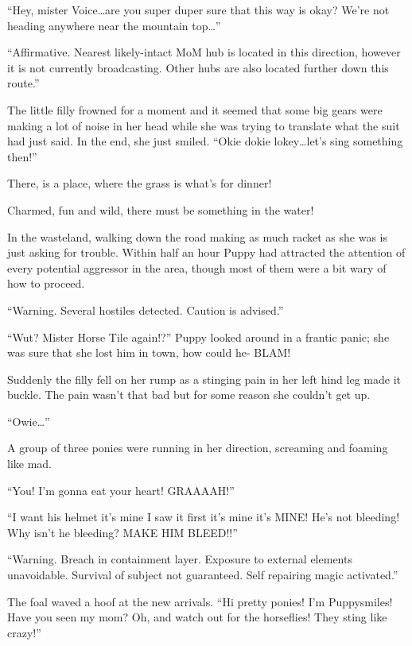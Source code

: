 ``Hey, mister Voice\dots are you super duper sure that this way is okay? We're not heading anywhere near the mountain top\dots''

``{\mt Affirmative. Nearest likely-intact MoM hub is located in this direction, however it is not currently broadcasting. Other hubs are also located further down this route.}''

The little filly frowned for a moment and it seemed that some big gears were making a lot of noise in her head while she was trying to translate what the suit had just said. In the end, she just smiled. ``Okie dokie lokey\dots let's sing something then!''

\begin{song}
    There, is a place, where the grass is what's for dinner!
    
    Charmed, fun and wild, there must be something in the water!
\end{song}

In the wasteland, walking down the road making as much racket as she was is just asking for trouble. Within half an hour Puppy had attracted the attention of every potential aggressor in the area, though most of them were a bit wary of how to proceed.

``{\mt Warning. Several hostiles detected. Caution is advised.}''

``Wut? Mister Horse Tile again!?'' Puppy looked around in a frantic panic; she was sure that she lost him in town, how could he- BLAM!

Suddenly the filly fell on her rump as a stinging pain in her left hind leg made it buckle. The pain wasn't that bad but for some reason she couldn't get up.

``Owie\dots''

A group of three ponies were running in her direction, screaming and foaming like mad.

``You! I'm gonna eat your heart! GRAAAAH!''

``I want his helmet it's mine I saw it first it's mine it's MINE! He's not bleeding! Why isn't he bleeding? MAKE HIM BLEED!!''

``{\mt Warning. Breach in containment layer. Exposure to external elements unavoidable. Survival of subject not guaranteed. Self repairing magic activated.}''

The foal waved a hoof at the new arrivals. ``Hi pretty ponies! I'm Puppysmiles! Have you seen my mom? Oh, and watch out for the horseflies! They sting like crazy!''

